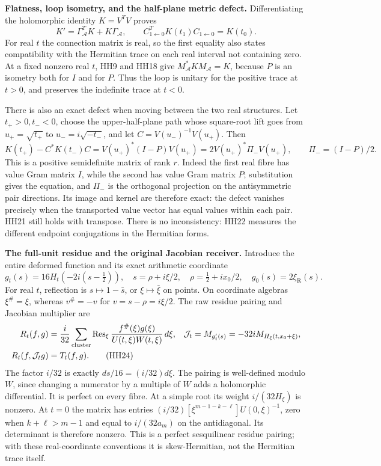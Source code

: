 \documentclass[11pt,a4paper]{article}
\theoremstyle{definition}\newtheorem{definition}[theorem]{Definition}
\begin{document}
\HH\textbf{Flatness, loop isometry, and the half-plane metric defect.}
Differentiating the holomorphic identity $K=V^TV$ proves
\[
 K'=\Gamma_{\mathcal A}^T K+K\Gamma_{\mathcal A},\qquad
 C_{1\gets0}^T K(t_1)C_{1\gets0}=K(t_0).
 \tag{HH21}\label{hh:bilinear-flat}
\]
For real $t$ the connection matrix is real, so the first equality
also states compatibility with the Hermitian trace on each real
interval not containing zero.
At a fixed nonzero real $t$, HH9 and HH18 give
$M_{\mathcal A}^*K M_{\mathcal A}=K$, because $P$ is an isometry
both for $I$ and for $P$. Thus the loop is unitary for the positive
trace at $t>0$, and preserves the indefinite trace at $t<0$.

There is also an exact defect when moving between the two real
structures. Let $t_+>0,t_-<0$, choose the upper-half-plane path
whose square-root lift goes from $u_+=\sqrt{t_+}$ to
$u_-=i\sqrt{-t_-}$, and let $C=V(u_-)^{-1}V(u_+)$.
Then
\[
 K(t_+)-C^*K(t_-)C
     =V(u_+)^*(I-P)V(u_+)
     =2V(u_+)^*\Pi_-V(u_+),\qquad
 \Pi_-=(I-P)/2 .
 \tag{HH22}\label{hh:halfplane}
\]
This is a positive semidefinite matrix of rank $r$.
Indeed the first real fibre has value Gram matrix $I$, while the
second has value Gram matrix $P$; substitution gives the equation,
and $\Pi_-$ is the orthogonal projection on the antisymmetric
pair directions. Its image and kernel are therefore exact:
the defect vanishes precisely when the transported value vector
has equal values within each pair. HH21 still holds with transpose.
There is no inconsistency: HH22 measures the different endpoint
conjugations in the Hermitian forms.

\HH\textbf{The full-unit residue and the original Jacobian receiver.}
Introduce the entire deformed function and its exact arithmetic
coordinate
\[
 g_t(s)=16H_t(-2i(s-\tfrac12)),\quad
 s=\rho+i\xi/2,\quad \rho=\tfrac12+ix_0/2,\quad
 g_0(s)=2\xi_{\mathrm R}(s).
 \tag{HH23}\label{hh:g}
\]
For real $t$, reflection is $s\mapsto1-\bar s$, or
$\xi\mapsto\bar\xi$ on points. On coordinate algebras $\xi^\#=\xi$,
whereas $v^\#=-v$ for $v=s-\rho=i\xi/2$.
The raw residue pairing and Jacobian multiplier are
\begin{align}
 R_t(f,g)&=\frac{i}{32}\sum_{\text{cluster}}
       \operatorname{Res}_\xi
       \frac{f^\#(\xi)g(\xi)}
            {U(t,\xi)W(t,\xi)}\,d\xi,&
 \mathcal J_t&=M_{g_t'(s)}=-32iM_{H_\xi(t,x_0+\xi)},\notag\\
 R_t(f,\mathcal J_tg)&=T_t(f,g).
 \tag{HH24}\label{hh:residue}
\end{align}
The factor $i/32$ is exactly $ds/16=(i/32)d\xi$.
The pairing is well-defined modulo $W$, since changing a numerator
by a multiple of $W$ adds a holomorphic differential.
It is perfect on every fibre. At a simple root its weight
$i/(32H_\xi)$ is nonzero. At $t=0$ the matrix has entries
$(i/32)[\xi^{m-1-k-\ell}]U(0,\xi)^{-1}$, zero when
$k+\ell>m-1$ and equal to $i/(32a_m)$ on the antidiagonal.
Its determinant is therefore nonzero. This is a perfect
sesquilinear residue pairing; with these real-coordinate conventions
it is skew-Hermitian, not the Hermitian trace itself.
\end{document}
